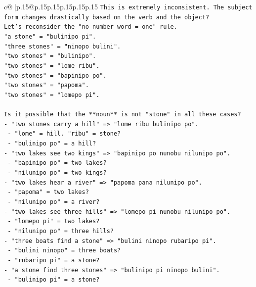 \documentclass{article}
\begin{document}
{\begin{supertabular}{c@{$\;$}|p{.15\linewidth}@{}p{.15\linewidth}p{.15\linewidth}p{.15\linewidth}p{.15\linewidth}p{.15\linewidth}}
{{{\texttt{This is extremely inconsistent. The subject form changes drastically based on the verb and the object?} \\
\texttt{Let's reconsider the "no number word = one" rule.} \\
\texttt{"a stone" = "bulinipo pi".} \\
\texttt{"three stones" = "ninopo bulini".} \\
\texttt{"two stones" = "bulinipo".} \\
\texttt{"two stones" = "lome ribu".} \\
\texttt{"two stones" = "bapinipo po".} \\
\texttt{"two stones" = "papoma".} \\
\texttt{"two stones" = "lomepo pi".} \\
\\ 
\texttt{Is it possible that the **noun** is not "stone" in all these cases?} \\
\texttt{{-} "two stones carry a hill" => "lome ribu bulinipo po".} \\
\texttt{  {-} "lome" = hill. "ribu" = stone?} \\
\texttt{  {-} "bulinipo po" = a hill?} \\
\texttt{{-} "two lakes see two kings" => "bapinipo po nunobu nilunipo po".} \\
\texttt{  {-} "bapinipo po" = two lakes?} \\
\texttt{  {-} "nilunipo po" = two kings?} \\
\texttt{{-} "two lakes hear a river" => "papoma pana nilunipo po".} \\
\texttt{  {-} "papoma" = two lakes?} \\
\texttt{  {-} "nilunipo po" = a river?} \\
\texttt{{-} "two lakes see three hills" => "lomepo pi nunobu nilunipo po".} \\
\texttt{  {-} "lomepo pi" = two lakes?} \\
\texttt{  {-} "nilunipo po" = three hills?} \\
\texttt{{-} "three boats find a stone" => "bulini ninopo rubaripo pi".} \\
\texttt{  {-} "bulini ninopo" = three boats?} \\
\texttt{  {-} "rubaripo pi" = a stone?} \\
\texttt{{-} "a stone find three stones" => "bulinipo pi ninopo bulini".} \\
\texttt{  {-} "bulinipo pi" = a stone?} \\
}}}
\end{supertabular}}
\end{document}
